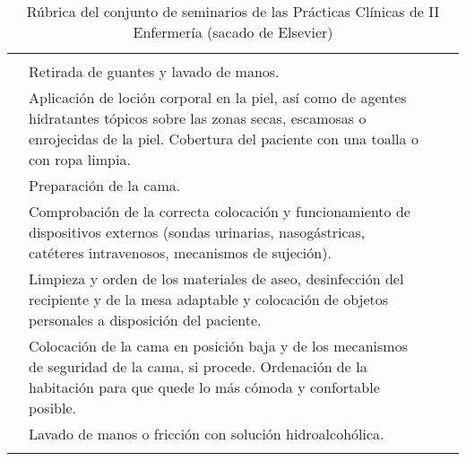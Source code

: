 \begin{landscape}
\begin{longtable}{N{0.15\textwidth}M{0.93\textwidth}|M{0.095\textwidth}M{0.22\textwidth}}
        & & \\  
        & Retirada de guantes y lavado de manos.
        & & \\  
        & Aplicación de loción corporal en la piel, así como de agentes hidratantes tópicos sobre las zonas secas, escamosas o enrojecidas de la piel. Cobertura del paciente con una toalla o con ropa limpia.
        & & \\  
        & Preparación de la cama.
        & & \\  
        & Comprobación de la correcta colocación y funcionamiento de dispositivos externos (sondas urinarias, nasogástricas, catéteres intravenosos, mecanismos de sujeción).
        & & \\  
        & Limpieza y orden de los materiales de aseo, desinfección del recipiente y de la mesa adaptable y colocación de objetos personales a disposición del paciente.
        & & \\  
        & Colocación de la cama en posición baja y de los mecanismos de seguridad de la cama, si procede. Ordenación de la habitación para que quede lo más cómoda y confortable posible.
        & & \\  
        & Lavado de manos o fricción con solución hidroalcohólica.
            & & \\ \hline
        \caption{Rúbrica del conjunto de seminarios de las Prácticas Clínicas de II Enfermería (sacado de Elsevier)}
        \label{tab:PlanXVIII:RubricaElsevier}   
    \end{longtable}
\end{landscape}